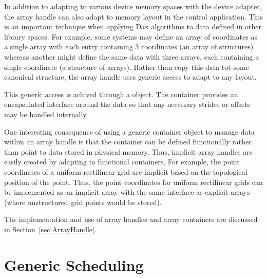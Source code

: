 In addition to adapting to various device memory spaces with the device
adapter, the array handle can also adapt to memory layout in the control
application. This is an important technique when applying Dax algorithms to
data defined in other library spaces. For example, some systems may define
an array of coordinates as a single array with each entry containing 3
coordinates (an array of structures) whereas another might define the same
data with three arrays, each containing a single coordinate (a structure of
arrays). Rather than copy this data tot some canonical structure, the array
handle uses generic access to adapt to any layout.


This generic access is achived through a 
 object. The container provides an encapsulated
interface around the data so that any necessary strides or offsets may be
handled internally.


One interesting consequence of using a generic container object to manage
data within an array handle is that the container can be defined
functionally rather than point to data stored in physical memory. Thus,
implicit array handles are easily created by adapting to functional
containers. For example, the point coordinates of a uniform rectilinear
grid are implicit based on the topological position of the point. Thus, the
point coordinates for uniform rectilinear grids can be implemented as an
implicit array with the same interface as explicit arrays (where
unstructured grid points would be stored).

The implementation and use of array handles and array containers are
discussed in Section~\ref{sec:ArrayHandle}.


\section{Generic Scheduling}
\label{sec:GenericScheduling}


